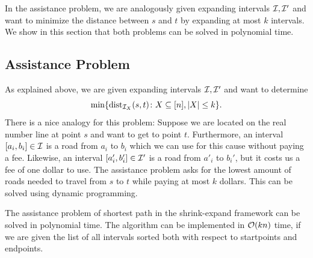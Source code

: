 In the assistance problem, we are analogously given expanding intervals $\mathcal{I}, \mathcal{I}'$ and want to minimize the distance between $s$ and $t$ by expanding at most $k$ intervals. We show in this section that both problems can be solved in polynomial time.

\subsection{Assistance Problem}
As explained above, we are given expanding intervals $\mathcal{I}, \mathcal{I}'$ and want to determine 
\[ \min \{ \operatorname{\text{dist}}_{\mathcal{I}_X}(s, t) \colon X \subseteq [n], |X| \leq k \}. \]
There is a nice analogy for this problem: Suppose we are located on the real number line at point $s$ and want to get to point $t$. Furthermore, an interval $[a_i, b_i] \in \mathcal{I}$ is a road from $a_i$ to $b_i$ which we can use for this cause without paying a fee. Likewise, an interval $[a_i', b_i'] \in \mathcal{I}'$ is a road from $a'_i$ to $b_i'$, but it costs us a fee of one dollar to use. The assistance problem asks for the lowest amount of roads needed to travel from $s$ to $t$ while paying at most $k$ dollars. This can be solved using dynamic programming. 
\begin{theorem}

The assistance problem of shortest path in the shrink-expand framework can be solved in polynomial time. The algorithm can be implemented in $\mathcal{O}(kn)$ time, if we are given the list of all intervals sorted both with respect to startpoints and endpoints.
\end{theorem}


